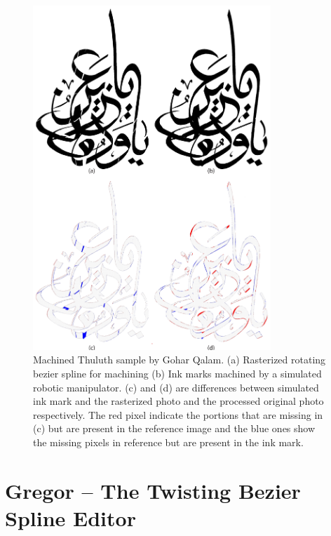 {\begin{figure}[H]
  \centering
  \includegraphics[width=0.8\textwidth]{Thuluth_Machined.pdf}
  \caption
  {
      Machined Thuluth sample by Gohar Qalam. (a) Rasterized rotating bezier spline for machining (b) Ink marks machined by a simulated robotic manipulator. (c) and (d) are differences between simulated ink mark and the rasterized photo and the processed original photo respectively. The red pixel indicate the portions that are missing in (c) but are present in the reference image and the blue ones show the missing pixels in reference but are present in the ink mark.
  }
\end{figure}
}
\section{Gregor -- The Twisting Bezier Spline Editor}\label{Chapter:Gregor}
